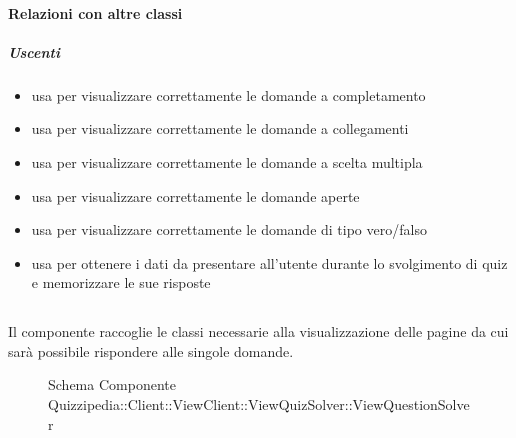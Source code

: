 \paragraph{Relazioni con altre classi}
\subparagraph{Uscenti}
\begin{itemize}
\item usa  per visualizzare correttamente le domande a completamento
\item usa  per visualizzare correttamente le domande a collegamenti
\item usa  per visualizzare correttamente le domande a scelta multipla
\item usa  per visualizzare correttamente le domande aperte
\item usa  per visualizzare correttamente le domande di tipo vero/falso
\item usa  per ottenere i dati da presentare all'utente durante lo svolgimento di quiz e memorizzare le sue risposte
\end{itemize}
\subsection{}
Il componente raccoglie le classi necessarie alla visualizzazione delle pagine da cui sarà possibile rispondere alle singole domande.
\begin{figure}[H]
\centering
\noindent{}
\caption[Schema Componente Quizzipedia::Client::ViewClient::ViewQuizSolver::ViewQuestionSolver]{Schema Componente Quizzipedia::Client::ViewClient::ViewQuizSolver::ViewQuestionSolver}
\end{figure}
